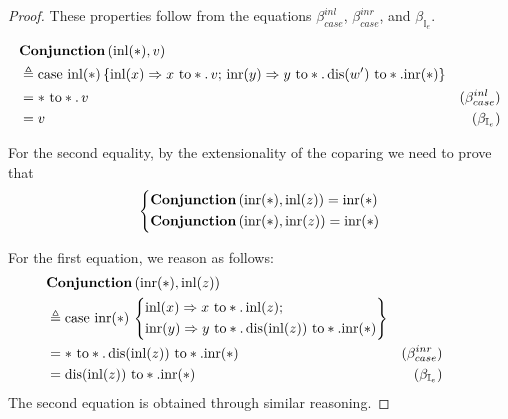   \begin{proof}
    These properties follow from the equations $\beta_{case}^{inl}$, $\beta_{case}^{inr}$, and $\beta_{\mathbb{I}_{e}}$.

    \begin{equation*}
    \begin{split}
      & \textbf{Conjunction} \, (\mathrm{inl}(*),v) \\
      & \triangleq  \text{case } \mathrm{inl}(*)\,
  \{\mathrm{inl}(x) \Rightarrow x \text{ to} *. \, v ;
  \, \mathrm{inr}(y) \Rightarrow y \text{ to} *. \,  \text{dis}(w') \text{ to} *. \mathrm{inr}(*)
  \} \\
  & = * \text{ to} *. \,v & (\beta_{case}^{inl}) \\
  & = v & (\beta_{\mathbb{I}_{e}}) 
    \end{split}
    \end{equation*}

    For the second equality, by the extensionality of the coparing we need to prove that 
     \[
      \left\{
      \begin{aligned}
      &   \textbf{Conjunction} \, (\mathrm{inr}(*), \mathrm{inl}(z)) = \mathrm{inr}(*)  \\
      & \textbf{Conjunction} \, (\mathrm{inr}(*), \mathrm{inr}(z)) = \mathrm{inr}(*)
      \end{aligned}
      \right.
      \]

    For the first equation, we reason as follows:
    \begin{align*}
      & \hspace{-22pt} \textbf{Conjunction} \, (\inr(*), \inl(z)) \\
      & \hspace{-22pt}  \triangleq  \text{case } \inr(*)\,   \left\{\begin{aligned} 
 &\inl(x) \Rightarrow x \text{ to} *. \,  \inl(z) ; \\
  &\inr(y) \Rightarrow y \text{ to} *. \,  \text{dis}(\inl(z)) \text{ to} *. \inr(*) \end{aligned} 
  \right\} \\
  & \hspace{-22pt}  =  *  \text{ to} *. \,  \text{dis}(\inl(z)) \text{ to} *. \inr(*) & (\beta_{case}^{inr}) \\
  & \hspace{-22pt}  =   \text{dis}(\inl(z)) \text{ to} *. \inr(*) & (\beta_{\mathbb{I}_{e}}) \\
    \end{align*}
      The second equation is obtained through similar reasoning.
  \end{proof}


